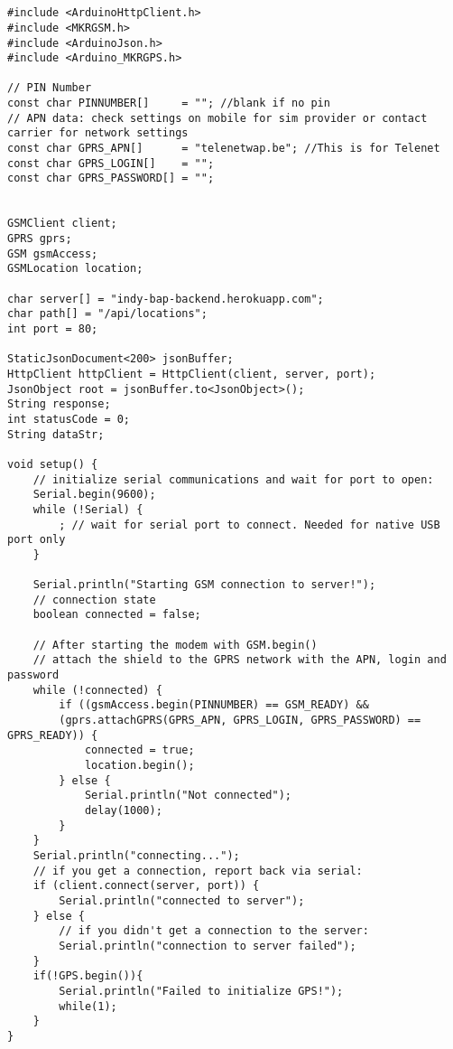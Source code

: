 \chapter{}
\label{ch:broncode_arduino}
\begin{lstlisting}
#include <ArduinoHttpClient.h>
#include <MKRGSM.h>
#include <ArduinoJson.h>
#include <Arduino_MKRGPS.h>

// PIN Number
const char PINNUMBER[]     = ""; //blank if no pin
// APN data: check settings on mobile for sim provider or contact carrier for network settings
const char GPRS_APN[]      = "telenetwap.be"; //This is for Telenet
const char GPRS_LOGIN[]    = ""; 
const char GPRS_PASSWORD[] = "";


GSMClient client;
GPRS gprs;
GSM gsmAccess;
GSMLocation location;

char server[] = "indy-bap-backend.herokuapp.com";
char path[] = "/api/locations";
int port = 80;

StaticJsonDocument<200> jsonBuffer;
HttpClient httpClient = HttpClient(client, server, port);
JsonObject root = jsonBuffer.to<JsonObject>();
String response;
int statusCode = 0;
String dataStr;

void setup() {
	// initialize serial communications and wait for port to open:
	Serial.begin(9600);
	while (!Serial) {
		; // wait for serial port to connect. Needed for native USB port only
	}
	
	Serial.println("Starting GSM connection to server!");
	// connection state
	boolean connected = false;
	
	// After starting the modem with GSM.begin()
	// attach the shield to the GPRS network with the APN, login and password
	while (!connected) {
		if ((gsmAccess.begin(PINNUMBER) == GSM_READY) &&
		(gprs.attachGPRS(GPRS_APN, GPRS_LOGIN, GPRS_PASSWORD) == GPRS_READY)) {
			connected = true;
			location.begin();
		} else {
			Serial.println("Not connected");
			delay(1000);
		}
	}
	Serial.println("connecting...");
	// if you get a connection, report back via serial:
	if (client.connect(server, port)) {
		Serial.println("connected to server");
	} else {
		// if you didn't get a connection to the server:
		Serial.println("connection to server failed");
	}
	if(!GPS.begin()){
		Serial.println("Failed to initialize GPS!");
		while(1);      
	}
}


\end{lstlisting}
